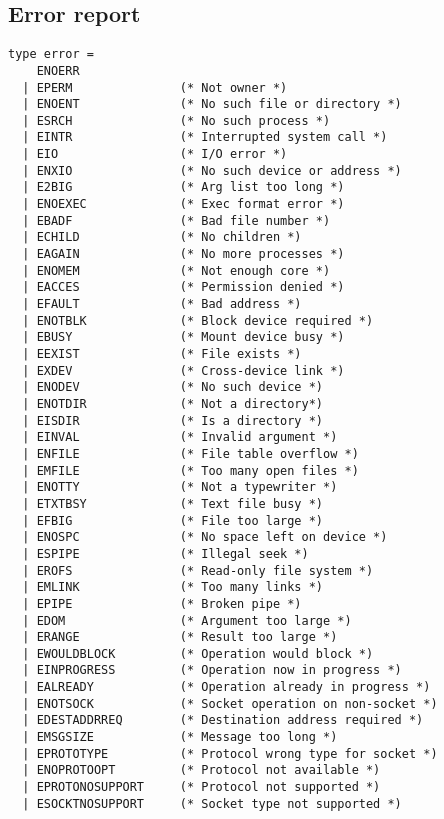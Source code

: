 
\label{s:unix}
%

\subsection*{Error report }\begin{verbatim}
type error =
    ENOERR
  | EPERM               (* Not owner *)
  | ENOENT              (* No such file or directory *)
  | ESRCH               (* No such process *)
  | EINTR               (* Interrupted system call *)
  | EIO                 (* I/O error *)
  | ENXIO               (* No such device or address *)
  | E2BIG               (* Arg list too long *)
  | ENOEXEC             (* Exec format error *)
  | EBADF               (* Bad file number *)
  | ECHILD              (* No children *)
  | EAGAIN              (* No more processes *)
  | ENOMEM              (* Not enough core *)
  | EACCES              (* Permission denied *)
  | EFAULT              (* Bad address *)
  | ENOTBLK             (* Block device required *)
  | EBUSY               (* Mount device busy *)
  | EEXIST              (* File exists *)
  | EXDEV               (* Cross-device link *)
  | ENODEV              (* No such device *)
  | ENOTDIR             (* Not a directory*)
  | EISDIR              (* Is a directory *)
  | EINVAL              (* Invalid argument *)
  | ENFILE              (* File table overflow *)
  | EMFILE              (* Too many open files *)
  | ENOTTY              (* Not a typewriter *)
  | ETXTBSY             (* Text file busy *)
  | EFBIG               (* File too large *)
  | ENOSPC              (* No space left on device *)
  | ESPIPE              (* Illegal seek *)
  | EROFS               (* Read-only file system *)
  | EMLINK              (* Too many links *)
  | EPIPE               (* Broken pipe *)
  | EDOM                (* Argument too large *)
  | ERANGE              (* Result too large *)
  | EWOULDBLOCK         (* Operation would block *)
  | EINPROGRESS         (* Operation now in progress *)
  | EALREADY            (* Operation already in progress *)
  | ENOTSOCK            (* Socket operation on non-socket *)
  | EDESTADDRREQ        (* Destination address required *)
  | EMSGSIZE            (* Message too long *)
  | EPROTOTYPE          (* Protocol wrong type for socket *)
  | ENOPROTOOPT         (* Protocol not available *)
  | EPROTONOSUPPORT     (* Protocol not supported *)
  | ESOCKTNOSUPPORT     (* Socket type not supported *)

\end{verbatim}
